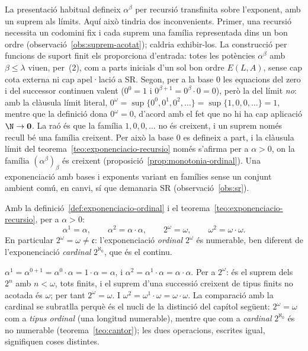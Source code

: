 \begin{observacio}\label{obs:exponenciacio-acotacio}
La presentació habitual defineix \(\alpha^{\beta}\) per recursió transfinita
sobre l'exponent, amb un suprem als límits. Aquí això tindria dos
inconvenients. Primer, una recursió necessita un codomini fix i cada suprem
una família representada dins un bon ordre (observació~\ref{obs:suprem-acotat});
caldria exhibir-los. La construcció per funcions de suport finit els
proporciona d'entrada: totes les potències \(\alpha^{\beta}\) amb
\(\beta\le\lambda\) viuen, per~(2), com a parts inicials d'un sol bon ordre
\(E(L,A)\), sense cap cota externa ni cap apel·lació a SR. Segon, per a la base \(0\) les equacions del zero i del successor
continuen valent (\(0^{0}=1\) i \(0^{\beta+1}=0^{\beta}\cdot0=0\)), però la
del límit \emph{no}: amb la clàusula límit literal,
\(0^{\omega}=\sup\{0^0,0^1,0^2,\dots\}=\sup\{1,0,0,\dots\}=1\), mentre que
la definició dona \(0^{\omega}=0\), d'acord amb el fet que no hi ha cap
aplicació \(\N\to\mathbf0\). La raó és que la família \(1,0,0,\dots\) no és
creixent, i un suprem només recull bé una família creixent. Per això la
base \(0\) es defineix a part, i la clàusula límit del
teorema~\ref{teo:exponenciacio-recursio} només s'afirma per a
\(\alpha>0\), on la família \((\alpha^\beta)_\beta\) és creixent
(proposició~\ref{prop:monotonia-ordinal}). Una exponenciació amb bases i exponents variant en famílies
sense un conjunt ambient comú, en canvi, sí que demanaria SR
(observació~\ref{obs:sr}).
\end{observacio}

\begin{proposicio}\label{prop:exponenciacio-calculs}
Amb la definició~\ref{def:exponenciacio-ordinal} i el teorema~\ref{teo:exponenciacio-recursio}, per a \(\alpha>0\):
\[
\alpha^{1}=\alpha,
\qquad
\alpha^{2}=\alpha\cdot\alpha,
\qquad
2^{\omega}=\omega,
\qquad
\omega^{2}=\omega\cdot\omega .
\]
En particular \(2^{\omega}=\omega\neq\mathfrak c\): l'exponenciació
\emph{ordinal} \(2^{\omega}\) és numerable, ben diferent de l'exponenciació
\emph{cardinal} \(2^{\aleph_0}\), que és el continu.
\end{proposicio}

\begin{prova}
\(\alpha^{1}=\alpha^{0+1}=\alpha^{0}\cdot\alpha=1\cdot\alpha=\alpha\), i
\(\alpha^{2}=\alpha^{1}\cdot\alpha=\alpha\cdot\alpha\). Per a \(2^{\omega}\):
és el suprem dels \(2^{n}\) amb \(n<\omega\), tots finits, i el suprem d'una
successió creixent de tipus finits no acotada és \(\omega\); per tant
\(2^{\omega}=\omega\). I \(\omega^{2}=\omega^{1}\cdot\omega=\omega\cdot\omega\).
La comparació amb la cardinal se subratlla perquè és el nucli de la distinció
del capítol següent: \(2^{\omega}=\omega\) com a \emph{tipus ordinal} (una
longitud numerable), mentre que com a \emph{cardinal} \(2^{\aleph_0}\) és no
numerable (teorema~\ref{teo:cantor}); les dues operacions, escrites igual,
signifiquen coses distintes.
\end{prova}

